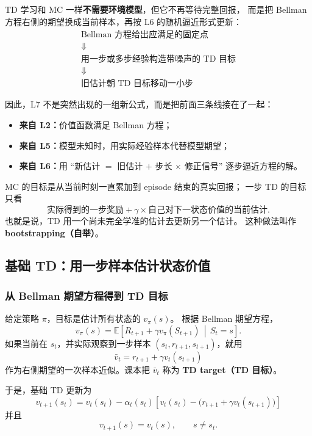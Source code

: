\documentclass[11pt,a4paper,fontset=fandol]{ctexart}
\newcommand{\E}{\mathbb{E}}
\newcommand{\given}{\,\middle|\,}
\begin{document}
TD 学习和 MC 一样\textbf{不需要环境模型}，但它不再等待完整回报，
而是把 Bellman 方程右侧的期望换成当前样本，再按 L6 的随机逼近形式更新：
\[
\boxed{
\begin{array}{c}
\text{Bellman 方程给出应满足的固定点}\\
\Downarrow\\
\text{用一步或多步经验构造带噪声的 TD 目标}\\
\Downarrow\\
\text{旧估计朝 TD 目标移动一小步}
\end{array}}
\]

因此，L7 不是突然出现的一组新公式，而是把前面三条线接在了一起：

\begin{itemize}
  \item \textbf{来自 L2：}价值函数满足 Bellman 方程；
  \item \textbf{来自 L5：}模型未知时，用实际经验样本代替模型期望；
  \item \textbf{来自 L6：}用
  “新估计 \(=\) 旧估计 \(+\) 步长 \(\times\) 修正信号”
  逐步逼近方程的解。
\end{itemize}

\begin{intuitionbox}[TD 最核心的变化]
MC 的目标是从当前时刻一直累加到 episode 结束的真实回报；
一步 TD 的目标只看
\[
\text{实际得到的一步奖励}
+\gamma\times
\text{自己对下一状态价值的当前估计}.
\]
也就是说，TD 用一个尚未完全学准的估计去更新另一个估计。
这种做法叫作 \textbf{bootstrapping（自举）}。
\end{intuitionbox}

\subsection{基础 TD：用一步样本估计状态价值}

\subsubsection{从 Bellman 期望方程得到 TD 目标}

给定策略 \(\pi\)，目标是估计所有状态的 \(v_\pi(s)\)。
根据 Bellman 期望方程，
\[
v_\pi(s)
=
\E\!\left[
R_{t+1}+\gamma v_\pi(S_{t+1})
\given S_t=s
\right].
\]
如果当前在 \(s_t\)，并实际观察到一步样本
\((s_t,r_{t+1},s_{t+1})\)，就用
\[
\boxed{\bar v_t=r_{t+1}+\gamma v_t(s_{t+1})}
\]
作为右侧期望的一次样本近似。课本把 \(\bar v_t\) 称为
\textbf{TD target（TD 目标）}。

于是，基础 TD 更新为
\[
\boxed{
v_{t+1}(s_t)
=
v_t(s_t)
-\alpha_t(s_t)
\left[
v_t(s_t)-\bigl(r_{t+1}+\gamma v_t(s_{t+1})\bigr)
\right]}
\]
并且
\[
v_{t+1}(s)=v_t(s),\qquad s\neq s_t.
\]
\end{document}
